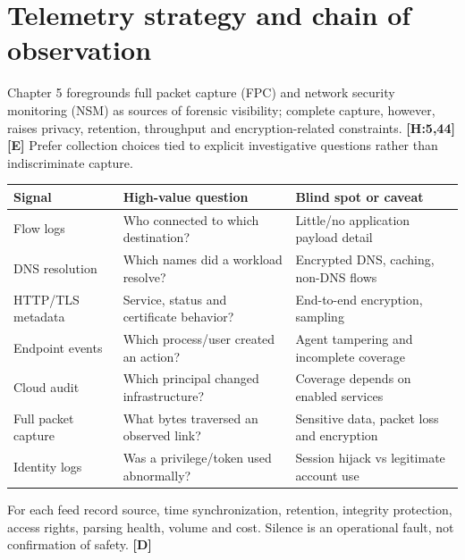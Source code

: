 \documentclass[10pt,letterpaper,oneside]{article}
\newcommand{\handbookref}[1]{\textsf{\color{accent}\textbf{[H:#1]}}}
\newcommand{\modernext}{\textsf{\color{muted}\textbf{[E]}}}
\newcommand{\designed}{\textsf{\color{accent}\textbf{[D]}}}
\begin{document}
\section{Telemetry strategy and chain of observation}
Chapter 5 foregrounds full packet capture (FPC) and network security monitoring (NSM) as sources of forensic visibility; complete capture, however, raises privacy, retention, throughput and encryption-related constraints. \handbookref{5,44} \modernext{} Prefer collection choices tied to explicit investigative questions rather than indiscriminate capture.
\par\medskip\noindent\begin{tabularx}{\textwidth}{@{}p{}X X@{}}\toprule
Signal & High-value question & Blind spot or caveat \\ \midrule
Flow logs & Who connected to which destination? & Little/no application payload detail\\
DNS resolution & Which names did a workload resolve? & Encrypted DNS, caching, non-DNS flows\\
HTTP/TLS metadata & Service, status and certificate behavior? & End-to-end encryption, sampling\\
Endpoint events & Which process/user created an action? & Agent tampering and incomplete coverage\\
Cloud audit & Which principal changed infrastructure? & Coverage depends on enabled services\\
Full packet capture & What bytes traversed an observed link? & Sensitive data, packet loss and encryption\\
Identity logs & Was a privilege/token used abnormally? & Session hijack vs legitimate account use\\
\bottomrule\end{tabularx}\par\medskip
For each feed record source, time synchronization, retention, integrity protection, access rights, parsing health, volume and cost. Silence is an operational fault, not confirmation of safety. \designed{}
\end{document}
